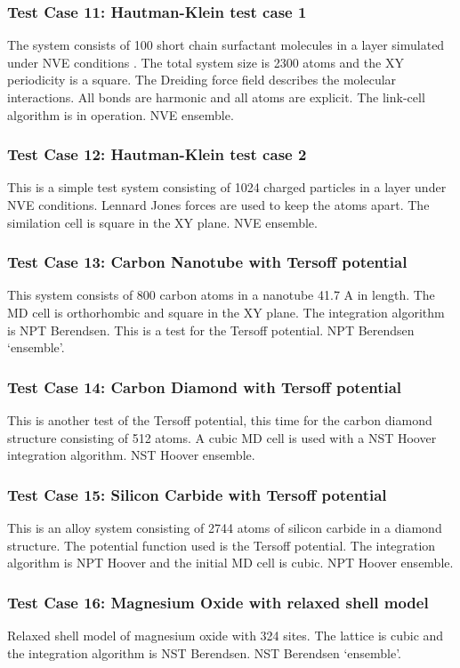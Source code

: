 \subsubsection{Test Case 11: Hautman-Klein test case 1}
The system consists of 100 short chain surfactant molecules in a layer
simulated under NVE conditions . The total system size is 2300 atoms and the
XY periodicity is a square. The Dreiding force field describes the molecular
interactions. All bonds are harmonic and all atoms are explicit. The link-cell
algorithm is in operation. NVE ensemble.

\subsubsection{Test Case 12: Hautman-Klein test case 2}
This is a simple test system consisting of 1024 charged particles in a
layer under NVE conditions. Lennard Jones forces are used to keep the
atoms apart. The similation cell is square in the XY plane. NVE ensemble.

\subsubsection{Test Case 13: Carbon Nanotube with Tersoff potential}
This system consists of 800 carbon atoms in a nanotube 41.7 A in length. The
MD cell is orthorhombic and square in the XY plane. The integration algorithm
is NPT Berendsen. This is a test for the Tersoff potential. NPT Berendsen
`ensemble'.

\subsubsection{Test Case 14: Carbon Diamond with Tersoff potential}
This is another test of the Tersoff potential, this time for the carbon
diamond structure consisting of 512 atoms. A cubic MD cell is used with a NST
Hoover integration algorithm. NST Hoover ensemble.

\subsubsection{Test Case 15: Silicon Carbide with Tersoff potential}
This is an alloy system consisting of 2744 atoms of silicon carbide in a
diamond structure. The potential function used is the Tersoff potential. The
integration algorithm is NPT Hoover and the initial MD cell is cubic. NPT
Hoover ensemble.

\subsubsection{Test Case 16: Magnesium Oxide with relaxed shell model}
Relaxed shell model of magnesium oxide with 324 sites. The lattice is cubic
and the integration algorithm is NST Berendsen. NST Berendsen `ensemble'.

